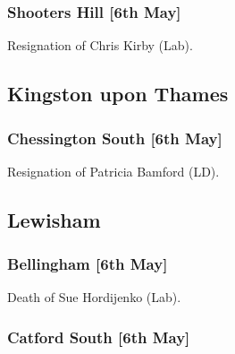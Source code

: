 \documentclass[a4paper,openany]{book}
\begin{document}
\begin{resultsiii}
\subsubsection*{Shooters Hill \hspace*{\fill}\nolinebreak[1]%
	\enspace\hspace*{\fill}
	[6th May]}


Resignation of Chris Kirby (Lab).

\subsection*{Kingston upon Thames}

\subsubsection*{Chessington South \hspace*{\fill}\nolinebreak[1]%
	\enspace\hspace*{\fill}
	[6th May]}


Resignation of Patricia Bamford (LD).

\subsection*{Lewisham}

\subsubsection*{Bellingham \hspace*{\fill}\nolinebreak[1]%
	\enspace\hspace*{\fill}
	[6th May]}


Death of Sue Hordijenko (Lab).

\subsubsection*{Catford South \hspace*{\fill}\nolinebreak[1]%
	\enspace\hspace*{\fill}
	[6th May]}


\end{resultsiii}
\end{document}
